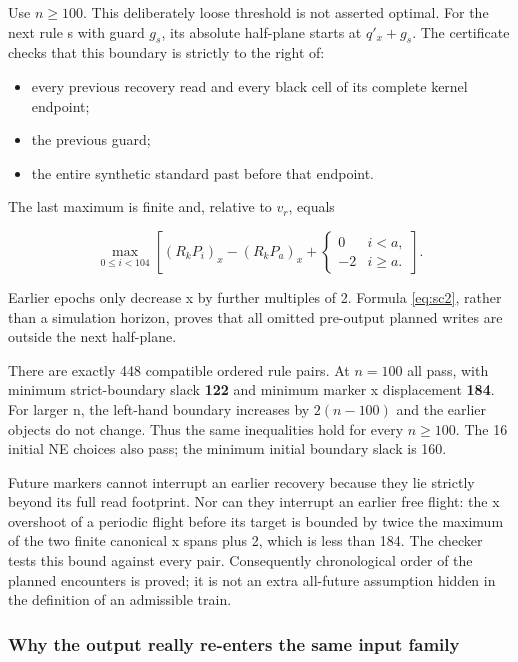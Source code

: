 Use $n\ge100$. This deliberately loose threshold is not asserted
optimal. For the next rule s with guard $g_s$, its absolute half-plane
starts at $q'_x+g_s$. The certificate checks that this boundary is
strictly to the right of:

\begin{itemize}
\tightlist
\item
  every previous recovery read and every black cell of its complete
  kernel endpoint;
\item
  the previous guard;
\item
  the entire synthetic standard past before that endpoint.
\end{itemize}

The last maximum is finite and, relative to $v_r$, equals

\begin{equation}\label{eq:sc2}
\max_{0\le i<104}\left[(R_kP_i)_x-(R_kP_a)_x+\begin{cases}0&i<a,\\-2&i\ge a.\end{cases}\right].
\end{equation}

Earlier epochs only decrease x by further multiples of 2. Formula \eqref{eq:sc2},
rather than a simulation horizon, proves that all omitted pre-output
planned writes are outside the next half-plane.

There are exactly 448 compatible ordered rule pairs. At $n=100$ all pass,
with minimum strict-boundary slack \textbf{122} and minimum marker x
displacement \textbf{184}. For larger n, the left-hand boundary
increases by $2(n-100)$ and the earlier objects do not change. Thus the
same inequalities hold for every $n\ge100$. The 16 initial NE
choices also pass; the minimum initial boundary slack is 160.

Future markers cannot interrupt an earlier recovery because they lie
strictly beyond its full read footprint. Nor can they interrupt an
earlier free flight: the x overshoot of a periodic flight before its
target is bounded by twice the maximum of the two finite canonical x
spans plus 2, which is less than 184. The checker tests this bound
against every pair. Consequently chronological order of the planned
encounters is proved; it is not an extra all-future assumption hidden in
the definition of an admissible train.

\subsubsection{Why the output really re-enters the same input
family}\label{why-the-output-really-re-enters-the-same-input-family}

